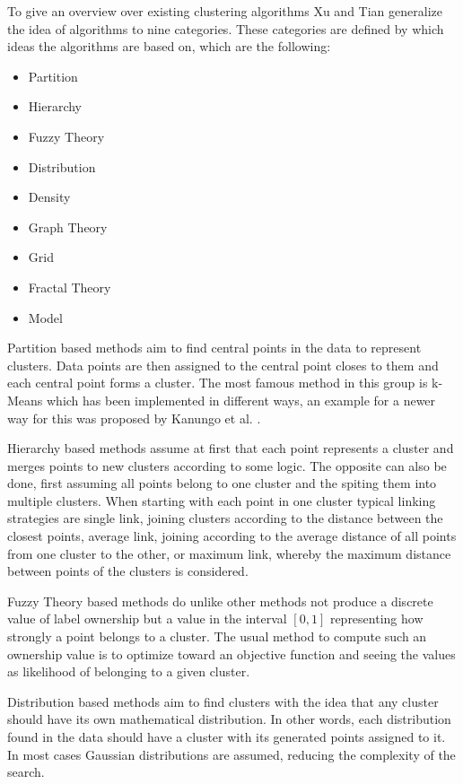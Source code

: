 \documentclass[
	a4paper,
	english,
	twoside,
	openright,               
	11pt                            
	]{report}
\begin{document}
To give an overview over existing clustering algorithms Xu and Tian \cite{surveyclustering} generalize the idea of algorithms to nine categories. These categories are defined by which ideas the algorithms are based on, which are the following:
\begin{itemize}
  \item Partition
  \item Hierarchy
  \item Fuzzy Theory
  \item Distribution
  \item Density
  \item Graph Theory
  \item Grid
  \item Fractal Theory
  \item Model
\end{itemize}

Partition based methods aim to find central points in the data to represent clusters. Data points are then assigned to the central point closes to them and each central point forms a cluster. The most famous method in this group is k-Means which has been implemented in different ways, an example for a newer way for this was proposed by Kanungo et al. \cite{1017616}.

Hierarchy based methods assume at first that each point represents a cluster and merges points to new clusters according to some logic. The opposite can also be done, first assuming all points belong to one cluster and the spiting them into multiple clusters. When starting with each point in one cluster typical linking strategies are single link, joining clusters according to the distance between the closest points, average link, joining according to the average distance of all points from one cluster to the other, or maximum link, whereby the maximum distance between points of the clusters is considered.

Fuzzy Theory based methods do unlike other methods not produce a discrete value of label ownership but a value in the interval $[0,1]$ representing how strongly a point belongs to a cluster. The usual method to compute such an ownership value is to optimize toward an objective function and seeing the values as likelihood of belonging to a given cluster.

Distribution based methods aim to find clusters with the idea that any cluster should have its own mathematical distribution. In other words, each distribution found in the data should have a cluster with its generated points assigned to it. In most cases Gaussian distributions are assumed, reducing the complexity of the search.
\end{document}
